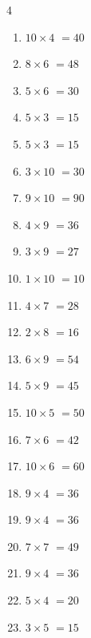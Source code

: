 \begin{multicols}{4}
\begin{enumerate}
  \item $10\times 4$
        $=40$

  \item $8\times 6$
        $=48$

  \item $5\times 6$
        $=30$

  \item $5\times 3$
        $=15$

  \item $5\times 3$
        $=15$

  \item $3\times 10$
        $=30$

  \item $9\times 10$
        $=90$

  \item $4\times 9$
        $=36$

  \item $3\times 9$
        $=27$

  \item $1\times 10$
        $=10$

  \item $4\times 7$
        $=28$

  \item $2\times 8$
        $=16$

  \item $6\times 9$
        $=54$

  \item $5\times 9$
        $=45$

  \item $10\times 5$
        $=50$

  \item $7\times 6$
        $=42$

  \item $10\times 6$
        $=60$

  \item $9\times 4$
        $=36$

  \item $9\times 4$
        $=36$

  \item $7\times 7$
        $=49$

\columnbreak %

  \item $9\times 4$
        $=36$

  \item $5\times 4$
        $=20$

  \item $3\times 5$
        $=15$


\end{enumerate}
\end{multicols}
